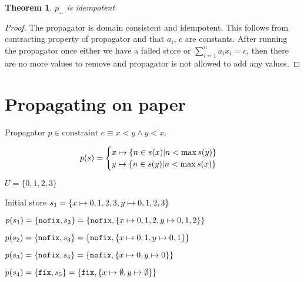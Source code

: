 \documentclass[a4paper, 11pt]{article}
\newtheorem{theorem}{Theorem}[section]
\newcommand\mymapsto{\mathrel{\ooalign{$\rightarrow$\cr%
  \kern-.15ex\raise.275ex\hbox{\scalebox{1}[0.522]{$\mid$}}\cr}}}
\begin{document}
\begin{theorem}
  $p_=$ is idempotent
\end{theorem}
\begin{proof}
The propagator is domain consistent and idempotent. This follows from contracting property of propagator and that $a_i$, $c$ are constants. After running the propagator once either we have a failed store or $\displaystyle\sum_{i=1}^{n} a_i x_i = c$, then there are no more values to remove and propagator is not allowed to add any values.
\end{proof}

\section*{Propagating on paper}
Propagator $p \in \text{constraint } c \equiv x < y \land y < x$.

\begin{gather*}
p(s) = 
\begin{cases}
  x \mymapsto \{n \in s(x) | n < \max s(y) \}\\
  y \mymapsto \{n \in s(y) | n < \max s(x) \}\\
\end{cases}
\end{gather*}

$U = \{0,1,2,3\}$

Initial store $s_1 = \{x \mymapsto {0,1,2,3}, y \mymapsto {0,1,2,3}\}$

$p(s_1) = \{\text{\texttt{nofix}}, s_2\} = \{\text{\texttt{nofix}}, \{x \mymapsto {0,1,2}, y \mymapsto {0,1,2}\}\}$

$p(s_2) = \{\text{\texttt{nofix}}, s_3\} = \{\text{\texttt{nofix}}, \{x \mymapsto {0,1}, y \mymapsto {0,1}\}\}$

$p(s_3) = \{\text{\texttt{nofix}}, s_4\} = \{\text{\texttt{nofix}}, \{x \mymapsto {0}, y \mymapsto {0}\}\}$

$p(s_4) = \{\text{\texttt{fix}}, s_5\} = \{\text{\texttt{fix}}, \{x \mymapsto \emptyset, y \mymapsto \emptyset\}\}$ 


{}

\end{document}
